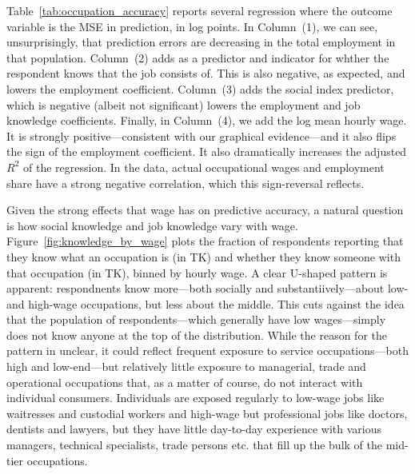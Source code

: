 \documentclass[11pt]{article}
\begin{document}
Table~\ref{tab:occupation_accuracy} reports several regression where the outcome variable is the MSE in prediction, in log points. 
In Column~(1), we can see, unsurprisingly, that prediction errors are decreasing in the total employment in that population. 
Column~(2) adds as a predictor and indicator for whther the respondent knows that the job consists of. 
This is also negative, as expected, and lowers the employment coefficient.  
Column~(3) adds the social index predictor, which is negative (albeit not significant) lowers the employment and job knowledge coefficients. 
Finally, in Column~(4), we add the log mean hourly wage. 
It is strongly positive---consistent with our graphical evidence---and it also flips the sign of the employment coefficient.  
It also dramatically increases the adjusted $R^2$ of the regression. 
In the data, actual occupational wages and employment share have a strong negative correlation, which this sign-reversal reflects. 



Given the strong effects that wage has on predictive accuracy, a natural question is how social knowledge and job knowledge vary with wage. 
Figure~\ref{fig:knowledge_by_wage} plots the fraction of respondents reporting that they know what an occupation is (in TK) and whether they know someone with that occupation (in TK), binned by hourly wage. 
A clear U-shaped pattern is apparent: respondnents know more---both socially and substantiively---about low- and high-wage occupations, but less about the middle. 
This cuts against the idea that the population of respondents---which generally have low wages---simply does not know anyone at the top of the distribution. 
While the reason for the pattern in unclear, it could reflect frequent exposure to service occupations---both high and low-end---but relatively little exposure to managerial, trade and operational occupations that, as a matter of course, do not interact with individual consumers.  
Individuals are exposed regularly to low-wage jobs like waitresses and custodial workers and high-wage but professional jobs like doctors, dentists and lawyers, but they have little day-to-day experience with various managers, technical specialists, trade persons etc. that fill up the bulk of the mid-tier occupations. 
\end{document}
